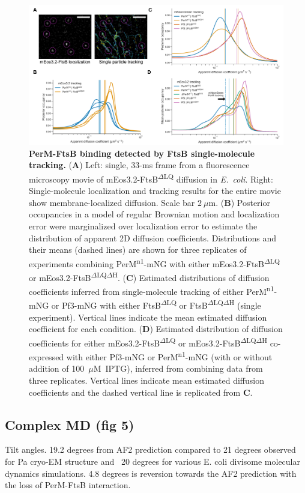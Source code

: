 \documentclass[pdflatex,sn-basic]{sn-jnl}%
\newcommand\ec{\textit{E.~coli}}
\newcommand\ftsbdLQ{FtsB\textsuperscript{$\Delta{}$LQ}}
\newcommand\ftsbdLQdH{FtsB\textsuperscript{$\Delta{}$LQ$\Delta{}$H}}
\newcommand\permN{PerM\textsuperscript{n1}}
\begin{document}
\begin{figure}[h]
\centering
\includegraphics[width=1.0\textwidth]{../figures/fig4.png}
\caption{
    \textbf{PerM-FtsB binding detected by FtsB single-molecule tracking.}
    (\textbf{A}) Left: single, 33-ms frame from a fluorescence microscopy movie of mEos3.2-\ftsbdLQ{} diffusion in \ec{}. Right: Single-molecule localization and tracking results for the entire movie show membrane-localized diffusion. Scale bar $2~\mu$m.
    (\textbf{B}) Posterior occupancies in a model of regular Brownian motion and localization error were marginalized over localization error to estimate the distribution of apparent 2D diffusion coefficients. Distributions and their means (dashed lines) are shown for three replicates of experiments combining \permN{}-mNG with either mEos3.2-\ftsbdLQ{} or mEos3.2-\ftsbdLQdH{}.
    (\textbf{C}) Estimated distributions of diffusion coefficients inferred from single-molecule tracking of either \permN{}-mNG or Pf3-mNG with either \ftsbdLQ{} or \ftsbdLQdH{} (single experiment). Vertical lines indicate the mean estimated diffusion coefficient for each condition.
    (\textbf{D}) Estimated distribution of diffusion coefficients for either mEos3.2-\ftsbdLQ{} or mEos3.2-\ftsbdLQdH{} co-expressed with either Pf3-mNG or \permN{}-mNG (with or without addition of 100~$\mu$M~IPTG), inferred from combining data from three replicates. Vertical lines indicate mean estimated diffusion coefficients and the dashed vertical line is replicated from \textbf{C}.
}\label{fig4}
\end{figure}

\subsection{Complex MD (fig 5)}

Tilt angles.
19.2 degrees from AF2 prediction compared to 21 degrees observed for Pa cryo-EM structure and ~20 degrees for various E. coli divisome molecular dynamics simulations.
4.8 degrees is reversion towards the AF2 prediction with the loss of PerM-FtsB interaction.
\end{document}
